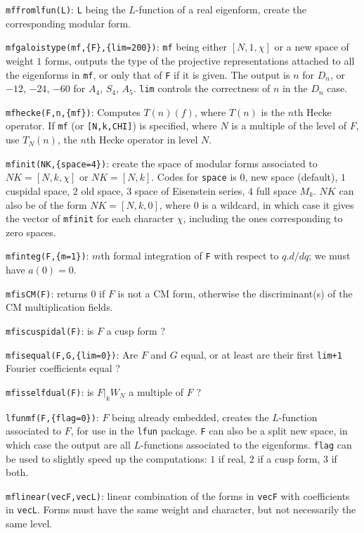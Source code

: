 \documentclass[11pt]{article}
\def\kbd#1{{\tt #1}}
\begin{document}
\kbd{mffromlfun(L)}: \kbd{L} being the $L$-function of a real eigenform,
create the corresponding modular form.

\kbd{mfgaloistype(mf,\{F\},\{lim=200\})}: \kbd{mf} being either $[N,1,\chi]$ or
a new space of weight $1$ forms, outputs the type of the projective
representations attached to all the eigenforms in \kbd{mf}, or only that of
\kbd{F} if it is given. The output is $n$ for $D_n$, or $-12$, $-24$, $-60$ for
$A_4$, $S_4$, $A_5$. \kbd{lim} controls the correctness of $n$ in the $D_n$
case.

\kbd{mfhecke(F,n,\{mf\})}: Computes $T(n)(f)$, where $T(n)$ is the $n$th Hecke
operator. If \kbd{mf} (or \kbd{[N,k,CHI]}) is specified, where $N$ is a
multiple of the level of $F$, use $T_N(n)$, the $n$th Hecke operator
in level $N$.

\kbd{mfinit(NK,\{space=4\})}: create the space of modular forms associated to
$NK=[N,k,\chi]$ or $NK=[N,k]$. Codes for \kbd{space} is $0$, new space
(default), $1$ cuspidal space, $2$ old space, $3$ space of Eisenstein series,
$4$ full space $M_k$. $NK$ can also be of the form $NK=[N,k,0]$,
where $0$ is a wildcard, in which case it gives the vector of \kbd{mfinit}
for each character $\chi$, including the ones corresponding to zero spaces.

\kbd{mfinteg(F,\{m=1\})}: $m$th formal integration of \kbd{F} with respect
to $q.d/dq$; we must have $a(0)=0$.

\kbd{mfisCM(F)}: returns $0$ if $F$ is not a CM form, otherwise the
discriminant(s) of the CM multiplication fields.

\kbd{mfiscuspidal(F)}: is $F$ a cusp form ?

\kbd{mfisequal(F,G,\{lim=0\})}: Are $F$ and $G$ equal, or at least are their
first \kbd{lim+1} Fourier coefficients equal ?

\kbd{mfisselfdual(F)}: is $F|_kW_N$ a multiple of $F$ ?

\kbd{lfunmf(F,\{flag=0\})}: $F$ being already embedded, creates the
$L$-function associated to $F$, for use in the \kbd{lfun} package.
\kbd{F} can also be a split new space, in which case the output are
all $L$-functions associated to the eigenforms. \kbd{flag} can be used to
slightly speed up the computations: $1$ if real, $2$ if a cusp form,
$3$ if both.

\kbd{mflinear(vecF,vecL)}: linear combination of the forms in \kbd{vecF}
with coefficients in \kbd{vecL}. Forms must have the same weight and
character, but not necessarily the same level.
\end{document}
